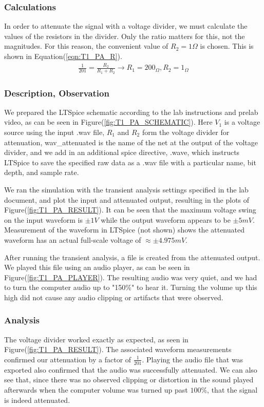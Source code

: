 \documentclass[11pt]{article}
\begin{document}
		\subsubsection{Calculations}
		In order to attenuate the signal with a voltage divider, we must calculate the values of the resistors in the divider. Only the ratio matters for this, not the magnitudes. For this reason, the convenient value of $R_2 = 1\Omega$ is chosen. This is shown in Equation(\ref{eqn:T1_PA_R}).
		\begin{align} \label{eqn:T1_PA_R} \frac{1}{201} = \frac{R_2}{R_1 + R_2} \rightarrow R_1 = 200_\Omega, R_2 = 1_\Omega\end{align}
	
		\subsubsection{Description, Observation}
			We prepared the LTSpice schematic according to the lab instructions and prelab video, as can be seen in Figure(\ref{fig:T1_PA_SCHEMATIC}). Here $V_1$ is a voltage source using the input .wav file, $R_1$ and $R_2$ form the voltage divider for attenuation, wav\_attenuated is the name of the net at the output of the voltage divider, and we add in an additional spice directive, .wave, which instructs LTSpice to save the specified raw data as a .wav file with a particular name, bit depth, and sample rate.
			
			We ran the simulation with the transient analysis settings specified in the lab document, and plot the input and attenuated output, resulting in the plots of Figure(\ref{fig:T1_PA_RESULT}). It can be seen that the maximum voltage swing on the input waveform is $\pm1V$ while the output waveform appears to be $\pm5mV$. Measurement of the waveform in LTSpice (not shown) shows the attenuated waveform has an actual full-scale voltage of $\approx \pm 4.975mV$.
			
			After running the transient analysis, a file is created from the attenuated output. We played this file using an audio player, as can be seen in Figure(\ref{fig:T1_PA_PLAYER}). The resulting audio was very quiet, and we had to turn the computer audio up to "150\%" to hear it. Turning the volume up this high did not cause any audio clipping or artifacts that were observed.
			
		\subsubsection{Analysis}
			The voltage divider worked exactly as expected, as seen in Figure(\ref{fig:T1_PA_RESULT}). The associated waveform measurements confirmed our attenuation by a factor of $\frac{1}{201}$. Playing the audio file that was exported also confirmed that the audio was successfully attenuated. We can also see that, since there was no observed clipping or distortion in the sound played afterwards when the computer volume was turned up past $100\%$, that the signal is indeed attenuated.
	
\end{document}

